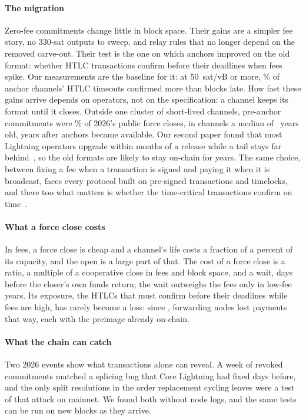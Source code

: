\paragraph{The migration}
Zero-fee commitments change little in block space. Their gains are a simpler fee story, no 330-sat outputs to sweep,
and relay rules that no longer depend on the removed carve-out. Their test is the one on which anchors improved on
the old format: whether HTLC transactions confirm before their deadlines when fees spike. Our measurements are the
baseline for it: at 50~sat/vB or more, \HtlcLateSpikeAnchor\% of anchor channels' HTLC timeouts confirmed more than
\HtlcMarginTight{} blocks late. How fast these gains arrive depends on operators,
not on the specification: a channel keeps its format until it closes. Outside one cluster of short-lived channels,
pre-anchor commitments were \LegacyPctExClusterTwentySix\% of 2026's public force closes, in channels a median of
\LegacyOldAgeYears~years old, years after anchors became available. Our second paper found that most Lightning
operators upgrade within months of a release while a tail stays far behind~\cite{kumar2026upgradedynamics}, so the old
formats are likely to stay on-chain for years. The same choice, between fixing a fee when a transaction is signed and paying it
when it is broadcast, faces every protocol built on pre-signed transactions and timelocks, and there too what matters
is whether the time-critical transactions confirm on time~\cite{riard2020timedilation}.

\paragraph{What a force close costs}
In fees, a force close is cheap and a channel's life costs a fraction of a percent of its capacity, and the open is a
large part of that. The cost of a force close is a ratio, a multiple of a cooperative close in fees and block space,
and a wait, days before the closer's own funds return; the wait outweighs the fees only in low-fee years. Its
exposure, the HTLCs that must confirm before their deadlines while fees are high, has rarely become a loss: since
\SplitResFromYear, forwarding nodes lost \SplitResForwarderPayments{} payments that way, each with the preimage already
on-chain.

\paragraph{What the chain can catch}
Two 2026 events show what transactions alone can reveal. A week of revoked commitments matched a splicing bug that
Core Lightning had fixed days before, and the only split resolutions in the order replacement cycling leaves were a
test of that attack on mainnet. We found both without node logs, and the same tests can be run on new blocks as they
arrive.

